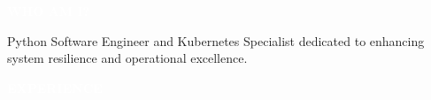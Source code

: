 \documentclass[9pt]{developercv} %
\renewcommand{\cvsect}[1]{%
    \vspace{\baselineskip} %
    \colorbox{primary}{\textcolor{white}{\MakeUppercase{\textbf{#1}}}}\\%
}
\begin{document}
\cvsect{Who Am I?}

\begin{minipage}[t]{0.4\textwidth} %
    \vspace{-\baselineskip} %
    
    Python Software Engineer and Kubernetes Specialist dedicated to enhancing system resilience and operational excellence.
\end{minipage}
\hfill %
\begin{minipage}[t]{0.5\textwidth} %
    \vspace{-\baselineskip} %
    \begin{barchart}{5.5}
    \end{barchart}
\end{minipage}

\begin{center}
\end{center}


\cvsect{Experience}
\end{document}
